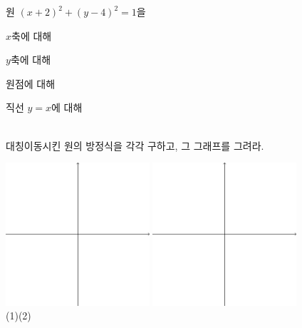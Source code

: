 \documentclass{oblivoir}
\begin{document}
\newpage
%
\prob{}\label{rreflect6}
원 \((x+2)^2+(y-4)^2=1\)을\\[10pt]
\begin{enumerate*}[itemjoin={,\quad}]
\item
\(x\)축에 대해
\item
\(y\)축에 대해
\item
원점에 대해
\item
직선 \(y=x\)에 대해
\end{enumerate*}
\\[10pt]
대칭이동시킨 원의 방정식을 각각 구하고, 그 그래프를 그려라.
\bigskip
\begin{center}
\includegraphics[width=0.4\textwidth]{xyaxes}\quad
\includegraphics[width=0.4\textwidth]{xyaxes}\\
(1)\qquad\qquad\qquad\qquad\qquad\qquad\quad(2)
\end{center}
\end{document}
